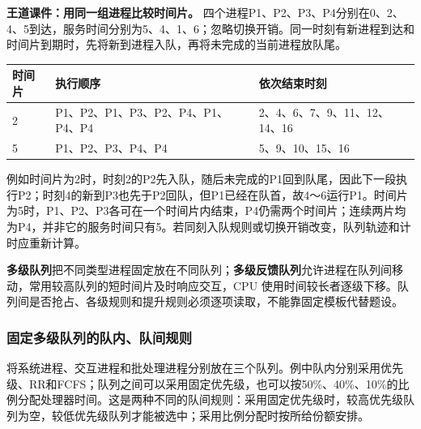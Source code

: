 \textbf{王道课件：用同一组进程比较时间片。} 四个进程P1、P2、P3、P4分别在0、2、4、5到达，服务时间分别为5、4、1、6；忽略切换开销。同一时刻有新进程到达和时间片到期时，先将新到进程入队，再将未完成的当前进程放队尾。

\par\medskip\noindent\begin{minipage}{\linewidth}\fontsize{9.3}{12}\selectfont\begin{tabularx}{\linewidth}{@{}YYY@{}}
\toprule\noalign{}
\begin{minipage}[b]{\linewidth}\raggedright
时间片
\end{minipage} & \begin{minipage}[b]{\linewidth}\raggedright
执行顺序
\end{minipage} & \begin{minipage}[b]{\linewidth}\raggedright
依次结束时刻
\end{minipage} \\
\midrule\noalign{}


2 & P1、P2、P1、P3、P2、P4、P1、P4、P4 & 2、4、6、7、9、11、12、14、16 \\
5 & P1、P2、P3、P4、P4 & 5、9、10、15、16 \\
\bottomrule\end{tabularx}
\end{minipage}\par\medskip

例如时间片为2时，时刻2的P2先入队，随后未完成的P1回到队尾，因此下一段执行P2；时刻4的新到P3也先于P2回队，但P1已经在队首，故4～6运行P1。时间片为5时，P1、P2、P3各可在一个时间片内结束，P4仍需两个时间片；连续两片均为P4，并非它的服务时间只有5。若同刻入队规则或切换开销改变，队列轨迹和计时应重新计算。

\textbf{多级队列}把不同类型进程固定放在不同队列；\textbf{多级反馈队列}允许进程在队列间移动，常用较高队列的短时间片及时响应交互，CPU 使用时间较长者逐级下移。队列间是否抢占、各级规则和提升规则必须逐项读取，不能靠固定模板代替题设。

\subsubsection{固定多级队列的队内、队间规则}\label{OS02-course-multilevel}

将系统进程、交互进程和批处理进程分别放在三个队列。例中队内分别采用优先级、RR和FCFS；队列之间可以采用固定优先级，也可以按50\%、40\%、10\%的比例分配处理器时间。这是两种不同的队间规则：采用固定优先级时，较高优先级队列为空，较低优先级队列才能被选中；采用比例分配时按所给份额安排。

